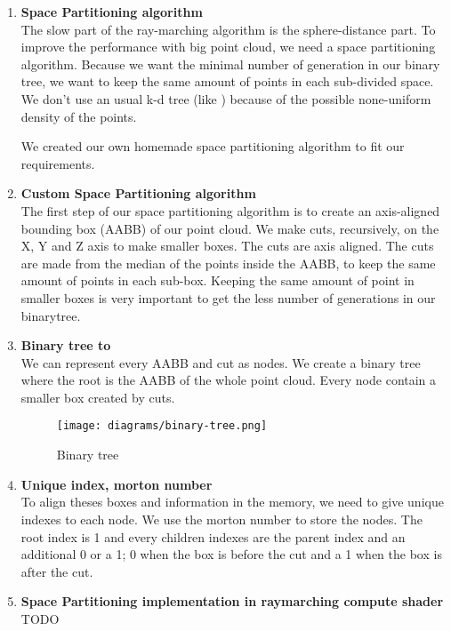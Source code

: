 \documentclass{rapportcs}
\begin{document}
\begin{enumerate}
    \item \textbf{Space Partitioning algorithm}\\
    The slow part of the ray-marching algorithm is the sphere-distance part.
    To improve the performance with big point cloud, we need a space partitioning algorithm. %
    Because we want the minimal number of generation in our binary tree, we want to keep the same amount of points in each sub-divided space.
    We don't use an usual k-d tree (like \cite{Bruce_Naylor_Partitioning_Trees}) because of the possible none-uniform density of the points.

    We created our own homemade space partitioning algorithm to fit our requirements.

    \item \textbf{Custom Space Partitioning algorithm}\\
    The first step of our space partitioning algorithm is to create an axis-aligned bounding box (AABB) of our point cloud.
    We make cuts, recursively, on the X, Y and Z axis to make smaller boxes.
    The cuts are axis aligned. The cuts are made from the median of the points inside the AABB, to keep the same amount of points in each sub-box. Keeping the same amount of point in smaller boxes is very important to get the less number of generations in our binarytree.
    
    \item \textbf{Binary tree to }\\
    We can represent every AABB and cut as nodes. We create a binary tree where the root is the AABB of the whole point cloud. Every node contain a smaller box created by cuts.

\begin{figure}[H]
    \centering
    \texttt{[image: diagrams/binary-tree.png]}
    \caption{Binary tree}
    \label{fig:label_image}
\end{figure}
    
    \item \textbf{Unique index, morton number}\\
    To align theses boxes and information in the memory, we need to give unique indexes to each node. We use the morton number to store the nodes. The root index is 1 and every children indexes are the parent index and an additional 0 or a 1; 0 when the box is before the cut and a 1 when the box is after the cut.
    
    \item \textbf{Space Partitioning implementation in raymarching compute shader}\\
    TODO
    
\end{enumerate}
\end{document}
